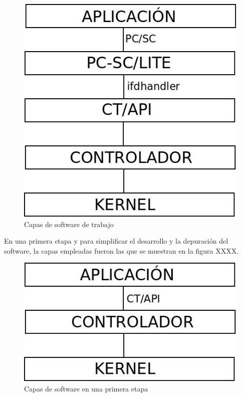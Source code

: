 \begin{figure}[H]
\centering
  \begin{center}
  \includegraphics[scale=.4]{Imagenes/SW_sc1.jpg} 
  \end{center}
  \caption{Capas de software de trabajo}\label{Fig:capas} 
\end{figure}

En una primera etapa y para simplificar el desarrollo y la depuración del software, la capas empleadas fueron las que se muestran en la figura XXXX.


\begin{figure}[H]
\centering
  \begin{center}
  \includegraphics[scale=.4]{Imagenes/SW_sc2.jpg} 
  \end{center}
  \caption{Capas de software en una primera etapa}\label{Fig:capas0} 
\end{figure}

